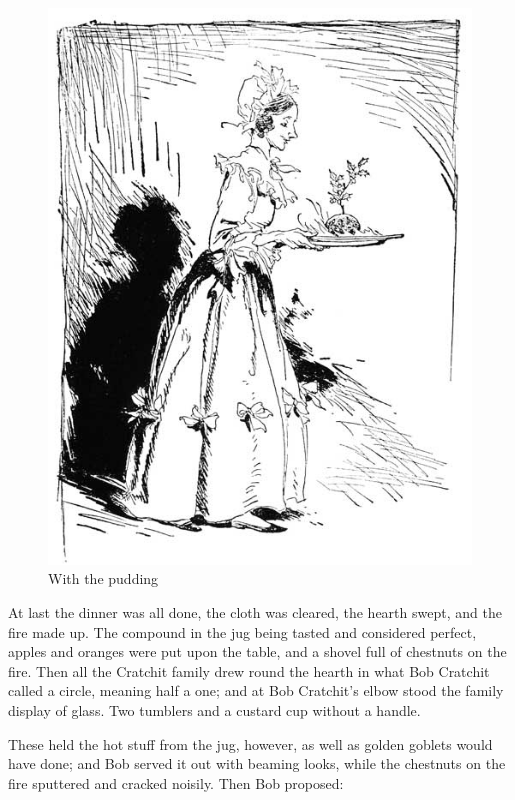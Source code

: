 \documentclass[paper=a5,BCOR=15mm,twoside,DIV=15,headinclude=off,12pt,chapterprefix=off,openany,headings=huge]{scrbook} %
\begin{document}
\begin{figure}
\begin{minipage}[c]{\linewidth}
\includegraphics[width=\linewidth]{gs113}
\caption*{With the pudding}
\end{minipage}
\end{figure}

At last the dinner was all done, the cloth was cleared, the hearth swept, and the fire made up. The compound in the jug being tasted and considered perfect, apples and oranges were put upon the table, and a shovel full of chestnuts on the fire. Then all the Cratchit family drew round the hearth in what Bob Cratchit called a circle, meaning half a one; and at Bob Cratchit's elbow stood the family display of glass. Two tumblers and a custard cup without a handle.

These held the hot stuff from the jug, however, as well as golden goblets would have done; and Bob served it out with beaming looks, while the chestnuts on the fire sputtered and cracked noisily. Then Bob proposed:
\end{document}

